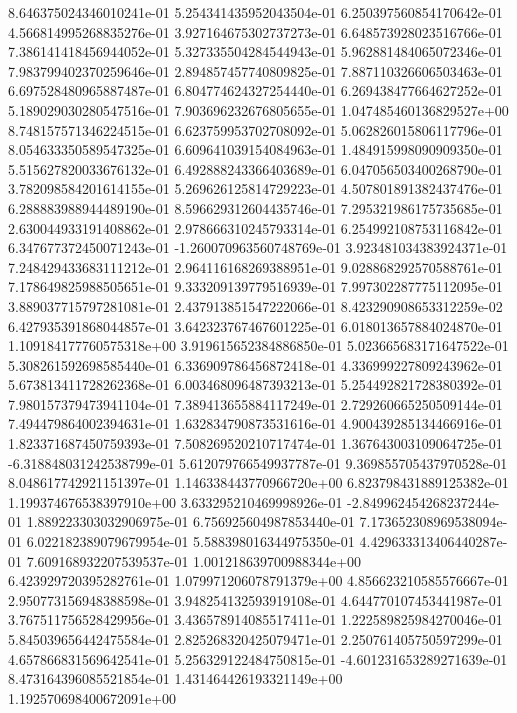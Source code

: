 8.646375024346010241e-01
5.254341435952043504e-01
6.250397560854170642e-01
4.566814995268835276e-01
3.927164675302737273e-01
6.648573928023516766e-01
7.386141418456944052e-01
5.327335504284544943e-01
5.962881484065072346e-01
7.983799402370259646e-01
2.894857457740809825e-01
7.887110326606503463e-01
6.697528480965887487e-01
6.804774624327254440e-01
6.269438477664627252e-01
5.189029030280547516e-01
7.903696232676805655e-01
1.047485460136829527e+00
8.748157571346224515e-01
6.623759953702708092e-01
5.062826015806117796e-01
8.054633350589547325e-01
6.609641039154084963e-01
1.484915998090909350e-01
5.515627820033676132e-01
6.492888243366403689e-01
6.047056503400268790e-01
3.782098584201614155e-01
5.269626125814729223e-01
4.507801891382437476e-01
6.288883988944489190e-01
8.596629312604435746e-01
7.295321986175735685e-01
2.630044933191408862e-01
2.978666310245793314e-01
6.254992108753116842e-01
6.347677372450071243e-01
-1.260070963560748769e-01
3.923481034383924371e-01
7.248429433683111212e-01
2.964116168269388951e-01
9.028868292570588761e-01
7.178649825988505651e-01
9.333209139779516939e-01
7.997302287775112095e-01
3.889037715797281081e-01
2.437913851547222066e-01
8.423290908653312259e-02
6.427935391868044857e-01
3.642323767467601225e-01
6.018013657884024870e-01
1.109184177760575318e+00
3.919615652384886850e-01
5.023665683171647522e-01
5.308261592698585440e-01
6.336909786456872418e-01
4.336999227809243962e-01
5.673813411728262368e-01
6.003468096487393213e-01
5.254492821728380392e-01
7.980157379473941104e-01
7.389413655884117249e-01
2.729260665250509144e-01
7.494479864002394631e-01
1.632834790873531616e-01
4.900439285134466916e-01
1.823371687450759393e-01
7.508269520210717474e-01
1.367643003109064725e-01
-6.318848031242538799e-01
5.612079766549937787e-01
9.369855705437970528e-01
8.048617742921151397e-01
1.146338443770966720e+00
6.823798431889125382e-01
1.199374676538397910e+00
3.633295210469998926e-01
-2.849962454268237244e-01
1.889223303032906975e-01
6.756925604987853440e-01
7.173652308969538094e-01
6.022182389079679954e-01
5.588398016344975350e-01
4.429633313406440287e-01
7.609168932207539537e-01
1.001218639700988344e+00
6.423929720395282761e-01
1.079971206078791379e+00
4.856623210585576667e-01
2.950773156948388598e-01
3.948254132593919108e-01
4.644770107453441987e-01
3.767511756528429956e-01
3.436578914085517411e-01
1.222589825984270046e-01
5.845039656442475584e-01
2.825268320425079471e-01
2.250761405750597299e-01
4.657866831569642541e-01
5.256329122484750815e-01
-4.601231653289271639e-01
8.473164396085521854e-01
1.431464426193321149e+00
1.192570698400672091e+00
